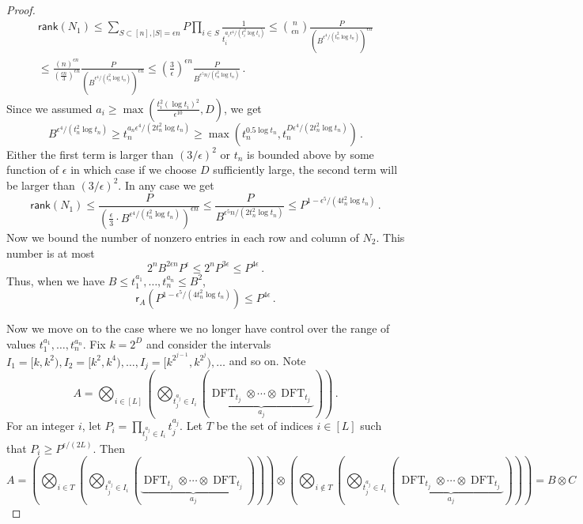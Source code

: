 \documentclass[11pt]{article}
\numberwithin{equation}{section}
\theoremstyle{definition}
\theoremstyle{plain}
\theoremstyle{definition}
\newcommand\rank{\textsf{rank}}
\DeclareMathOperator{\DFT}{DFT}
\begin{document}
\begin{proof}
\begin{eqnarray*}
\rank(N_1) \leq \sum_{S \subset [n], |S| = \epsilon n} P\prod_{i \in S}\frac{1}{t_i^{a_i \epsilon^4/(t_i^2 \log t_i)}} \leq \binom{n}{\epsilon n}\frac{P}{\left(B^{\epsilon^4/(t_n^2 \log t_n)}\right)^{\epsilon n}} \\  \leq \frac{(n)^{\epsilon n}}{\left(\frac{\epsilon n}{3}\right)^{\epsilon n}} \frac{P}{\left(B^{\epsilon^4/(t_n^2 \log t_n)}\right)^{\epsilon n}}\leq \left(\frac{3}{\epsilon}\right)^{\epsilon n} \frac{P}{B^{\epsilon^5 n/(t_n^2 \log t_n)}} \,.
\end{eqnarray*}
Since we assumed $a_i \geq \max\left(\frac{t_i^2(\log t_i)^2}{\epsilon^{10}}, D \right)$, we get
\[
B^{\epsilon^4/(t_n^2 \log t_n)} \geq t_n^{a_n \epsilon^4/(2 t_n^2 \log t_n)} \geq \max \left(t_n^{0.5 \log t_n},t_n^{D \epsilon^4/(2 t_n^2 \log t_n)} \right) \,.
\]
Either the first term is larger than $(3/\epsilon)^2$ or $t_n$ is bounded above by some function of $\epsilon$ in which case if we choose $D$ sufficiently large, the second term will be larger than $(3/\epsilon)^2$.  In any case we get
\[
\rank(N_1) \leq \frac{P}{\left(\frac{\epsilon}{3} \cdot  B^{\epsilon^4/(t_n^2 \log t_n)}\right)^{\epsilon n}} \leq \frac{P}{B^{\epsilon^5 n/(2t_n^2 \log t_n)}} \leq P^{1 - \epsilon^5/(4t_n^2 \log t_n)} \,.
\]
Now we bound the number of nonzero entries in each row and column of $N_2$.  This number is at most
\[
2^nB^{2 \epsilon n}P^{\epsilon} \leq 2^n P^{3\epsilon} \leq P^{4\epsilon} \,.
\]
Thus, when we have $B \leq t_1^{a_1}, \dots , t_n^{a_n} \leq B^2$, 
\[
\textsf{r}_A\left( P^{1 - \epsilon^5/(4t_n^2 \log t_n)} \right) \leq  P^{4\epsilon} \,.
\]

Now we move on to the case where we no longer have control over the range of values $t_1^{a_1}, \dots , t_n^{a_n}$.  Fix $k = 2^D$ and consider the intervals $I_1 = [k,k^2), I_2 = [k^2, k^4), \dots , I_j = [k^{2^{j-1}}, k^{2^j}), \dots $ and so on.  Note 
%
%
%
%
\[
A = \bigotimes_{i \in [L]}\left(\bigotimes_{t_j^{a_j} \in I_i} (\underbrace{\DFT_{t_j} \otimes \cdots \otimes \DFT_{t_j}}_\text{$a_j$})\right) \,.
\]
%
For an integer $i$, let $P_i = \prod_{t_j^{a_j} \in I_i}t_j^{a_j}$.  Let $T$ be the set of indices $i \in [L]$ such that $P_i \geq P^{\epsilon/(2L)}$.  Then 
%
%
%
%
\[
A = \left( \bigotimes_{i \in T}\left(\bigotimes_{t_j^{a_j} \in I_i} (\underbrace{\DFT_{t_j} \otimes \cdots \otimes \DFT_{t_j}}_\text{$a_j$})\right) \right) \otimes \left( \bigotimes_{i \notin T}\left(\bigotimes_{t_j^{a_j} \in I_i} (\underbrace{\DFT_{t_j} \otimes \cdots \otimes \DFT_{t_j}}_\text{$a_j$})\right) \right) = B \otimes C
\]
%


\end{proof}
\end{document}
